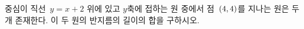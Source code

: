 중심이 직선~$y=x+2$ 위에 있고 $y$축에 접하는 원 중에서 점~$(4{,}\mkern3mu\mathopen{}4)$를 지나는 원은 두 개 존재한다. 이 두 원의 반지름의 길이의 합을 구하시오.
